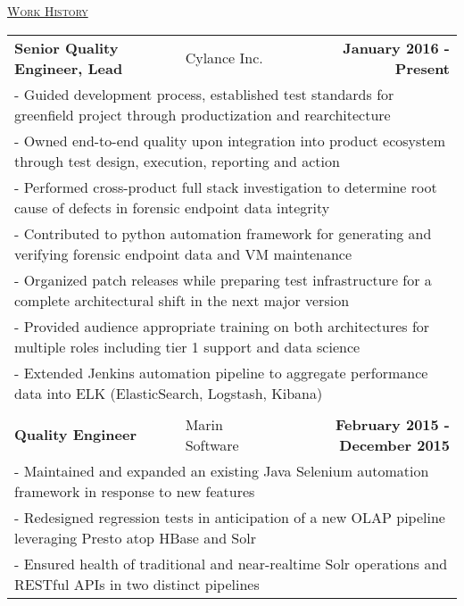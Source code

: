 \documentclass[letterpaper]{article}
\begin{document}
	\begin{center}
		\underline{\large \scshape Work History} \\
		\begin{tabular}{p{}p{}r}
			\\
				\textbf{Senior Quality Engineer, Lead}									&
				Cylance Inc.										&
				\textbf{January 2016 - Present}
			\\
				\multicolumn{3}{p{\textwidth}}{\quad\quad - Guided development process, established test standards for greenfield project through productization and rearchitecture} 
			\\
				\multicolumn{3}{p{\textwidth}}{\quad\quad - Owned end-to-end quality upon integration into product ecosystem through test design, execution, reporting and action} 
			\\
				\multicolumn{3}{p{\textwidth}}{\quad\quad - Performed cross-product full stack investigation to determine root cause of defects in forensic endpoint data integrity} 
			\\
				\multicolumn{3}{p{\textwidth}}{\quad\quad - Contributed to python automation framework for generating and verifying forensic endpoint data and VM maintenance} 
			\\
				\multicolumn{3}{p{\textwidth}}{\quad\quad - Organized patch releases while preparing test infrastructure for a complete architectural shift in the next major version} 
			\\
				\multicolumn{3}{p{\textwidth}}{\quad\quad - Provided audience appropriate training on both architectures for multiple roles including tier 1 support and data science}
			\\
				\multicolumn{3}{p{\textwidth}}{\quad\quad - Extended Jenkins automation pipeline to aggregate performance data into ELK (ElasticSearch, Logstash, Kibana)}  
			\\
			\\
				\textbf{Quality Engineer}									&
				Marin Software										&
				\textbf{February 2015 - December 2015}
			\\
				\multicolumn{3}{p{\textwidth}}{\quad\quad - Maintained and expanded an existing Java Selenium automation framework in response to new features} 
			\\
				\multicolumn{3}{p{\textwidth}}{\quad\quad - Redesigned regression tests in anticipation of a new OLAP pipeline leveraging Presto atop HBase and Solr} 
			\\
				\multicolumn{3}{p{\textwidth}}{\quad\quad - Ensured health of traditional and near-realtime Solr operations and RESTful APIs in two distinct pipelines } 

\end{tabular}
\end{center}
\end{document}
